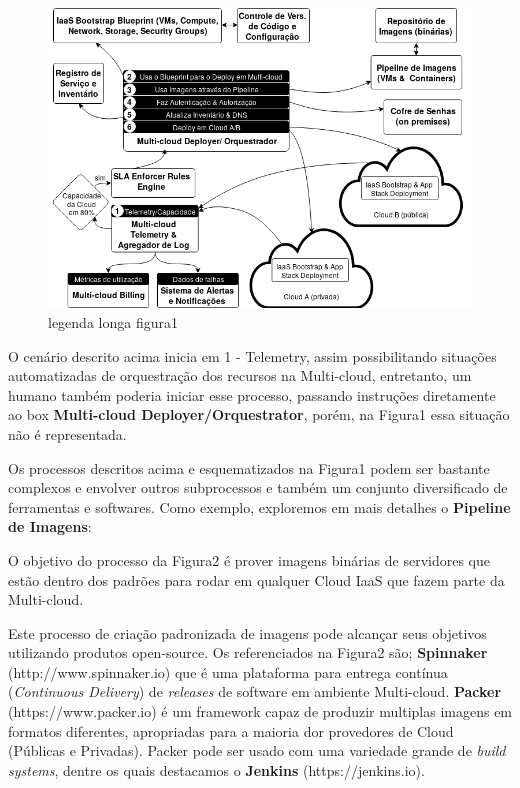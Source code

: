 \documentclass[12pt]{article}
\begin{document}
		\begin{figure}[H]
			\centering
			\includegraphics[width=0.9\linewidth]{figuras/Figure1.png}
			\caption{legenda longa figura1}
			\label{fig:figure1}
		\end{figure}

	O cenário descrito acima inicia em 1 - Telemetry, assim possibilitando situações automatizadas de orquestração dos recursos na Multi-cloud, entretanto, um humano também poderia iniciar esse processo, passando instruções diretamente ao box \textbf{Multi-cloud Deployer/Orquestrator}, porém, na Figura1 essa situação não é representada.  
	
	Os processos descritos acima e esquematizados na Figura1 podem ser bastante complexos e envolver outros subprocessos e também um conjunto diversificado de ferramentas e softwares. Como exemplo, exploremos em mais detalhes o \textbf{Pipeline de Imagens}:
	

	
	O objetivo do processo da Figura2 é prover imagens binárias de servidores que estão dentro dos padrões para rodar em qualquer Cloud IaaS que fazem parte da Multi-cloud.
	
	Este processo de criação padronizada de imagens pode alcançar seus objetivos utilizando produtos open-source. Os referenciados na Figura2 são; \textbf{Spinnaker} (http://www.spinnaker.io) que é uma plataforma para entrega contínua (\textit{Continuous Delivery}) de \textit{releases} de software em ambiente Multi-cloud. \textbf{Packer} (https://www.packer.io) é um framework capaz de produzir multiplas imagens em formatos diferentes, apropriadas para a maioria dor provedores de Cloud (Públicas e Privadas). Packer pode ser usado com uma variedade grande de \textit{build systems}, dentre os quais destacamos o \textbf{Jenkins} (https://jenkins.io).
	
\end{document}
